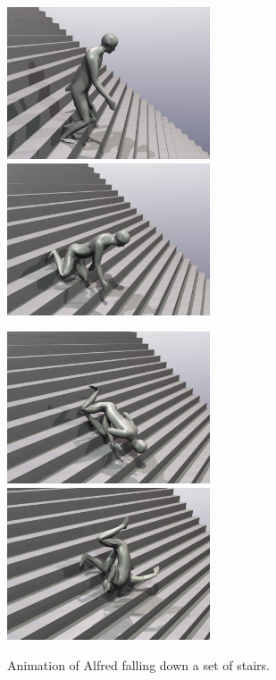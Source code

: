 \begin{figure}
\centerline{\includegraphics[width=60mm,height=45mm]{figures/stairs1} \hspace{5mm}
            \includegraphics[width=60mm,height=45mm]{figures/stairs2}}\vspace{5mm}
\centerline{\includegraphics[width=60mm,height=45mm]{figures/stairs3} \hspace{5mm}
            \includegraphics[width=60mm,height=45mm]{figures/stairs4}}
\caption{Animation of Alfred falling down a set of stairs.\label{sampleStairs}}
\end{figure}


